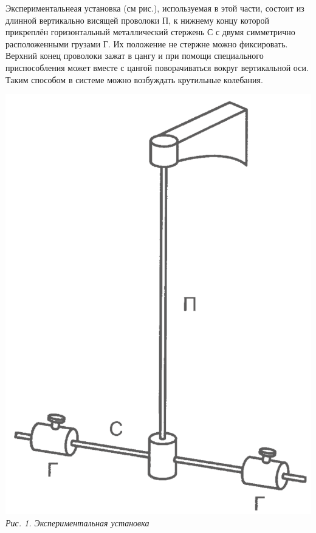 \documentclass[12pt, a4paper]{article}
\begin{document}
\noindent\begin{minipage}[c]{0.53\textwidth}
    \hspace{1cm}
    Экспериментальнеая установка (см рис.), используемая в этой части, состоит из длинной вертикально висящей проволоки П, к нижнему концу которой прикреплён горизонтальный металлический стержень С с двумя симметрично расположенными грузами Г. 
    Их положение не стержне можно фиксировать. Верхний конец проволоки зажат в цангу и при помощи специального приспособления может вместе с цангой поворачиваться вокруг вертикальной оси. 
    Таким способом в системе можно возбуждать крутильные колебания. 
    

\end{minipage}
\begin{minipage}[c]{0.42\textwidth}
    \begin{center}
        \includegraphics[scale=0.42]{Pics/picture1.png} \\
        \textit{\textcolor[HTML]{000000}{Рис. 1. Экспериментальная установка}}
    \end{center}
\end{minipage}  
\end{document}
